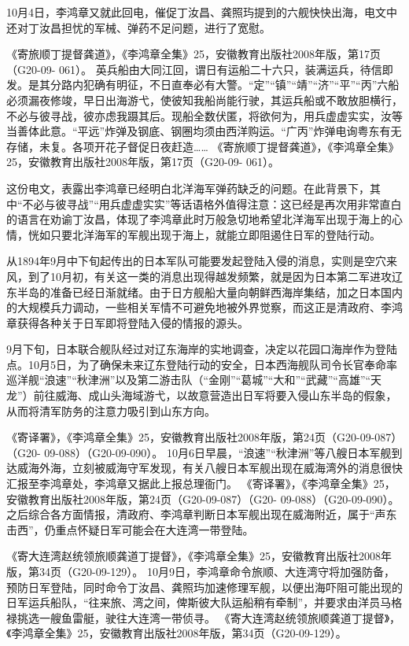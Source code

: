 \documentclass[12pt,UTF8]{ctexbook}
\begin{document}
10月4日，李鸿章又就此回电，催促丁汝昌、龚照玙提到的六舰快快出海，电文中还对丁汝昌担忧的军械、弹药不足问题，进行了宽慰。

《寄旅顺丁提督龚道》，《李鸿章全集》25，安徽教育出版社2008年版，第17页（G20-09- 061）。
英兵船由大同江回，谓日有运船二十六只，装满运兵，待信即发。是其分路内犯确有明征，不日直奉必有大警。“定”“镇”“靖”“济”“平”“丙”六船必须漏夜修竣，早日出海游弋，使彼知我船尚能行驶，其运兵船或不敢放胆横行，不必与彼寻战，彼亦虑我蹑其后。现船全数伏匿，将欲何为，用兵虚虚实实，汝等当善体此意。“平远”炸弹及钢底、钢圈均须由西洋购运。“广丙”炸弹电询粤东有无存储，未复。各项开花子督促日夜赶造…… 《寄旅顺丁提督龚道》，《李鸿章全集》25，安徽教育出版社2008年版，第17页（G20-09- 061）。

这份电文，表露出李鸿章已经明白北洋海军弹药缺乏的问题。在此背景下，其中“不必与彼寻战”“用兵虚虚实实”等话语格外值得注意：这已经是再次用非常直白的语言在劝谕丁汝昌，体现了李鸿章此时万般急切地希望北洋海军出现于海上的心情，恍如只要北洋海军的军舰出现于海上，就能立即阻遏住日军的登陆行动。

从1894年9月中下旬起传出的日本军队可能要发起登陆入侵的消息，实则是空穴来风，到了10月初，有关这一类的消息出现得越发频繁，就是因为日本第二军进攻辽东半岛的准备已经日渐就绪。由于日方舰船大量向朝鲜西海岸集结，加之日本国内的大规模兵力调动，一些相关军情不可避免地被外界觉察，而这正是清政府、李鸿章获得各种关于日军即将登陆入侵的情报的源头。

9月下旬，日本联合舰队经过对辽东海岸的实地调查，决定以花园口海岸作为登陆点。10月5日，为了确保未来辽东登陆行动的安全，日本西海舰队司令长官奉命率巡洋舰“浪速”“秋津洲”以及第二游击队（“金刚”“葛城”“大和”“武藏”“高雄”“天龙”）前往威海、成山头海域游弋，以故意营造出日军将要入侵山东半岛的假象，从而将清军防务的注意力吸引到山东方向。

《寄译署》，《李鸿章全集》25，安徽教育出版社2008年版，第24页（G20-09-087）（G20- 09-088）（G20-09-090）。
10月6日早晨，“浪速”“秋津洲”等八艘日本军舰到达威海外海，立刻被威海守军发现，有关八艘日本军舰出现在威海湾外的消息很快汇报至李鸿章处，李鸿章又据此上报总理衙门。 《寄译署》，《李鸿章全集》25，安徽教育出版社2008年版，第24页（G20-09-087）（G20- 09-088）（G20-09-090）。之后综合各方面情报，清政府、李鸿章判断日本军舰出现在威海附近，属于“声东击西”，仍重点怀疑日军可能会在大连湾一带登陆。

《寄大连湾赵统领旅顺龚道丁提督》，《李鸿章全集》25，安徽教育出版社2008年版，第34页（G20-09-129）。
10月9日，李鸿章命令旅顺、大连湾守将加强防备，预防日军登陆，同时命令丁汝昌、龚照玙加速修理军舰，以便出海吓阻可能出现的日军运兵船队，“往来旅、湾之间，俾斯彼大队运船稍有牵制”，并要求由洋员马格禄挑选一艘鱼雷艇，驶往大连湾一带侦寻。 《寄大连湾赵统领旅顺龚道丁提督》，《李鸿章全集》25，安徽教育出版社2008年版，第34页（G20-09-129）。
\end{document}
